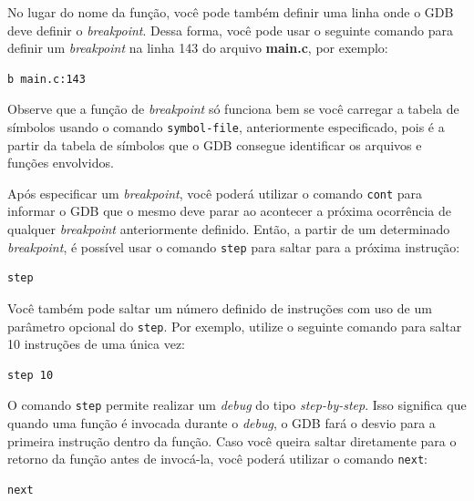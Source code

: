 \documentclass[11pt]{article}
\begin{document}
No lugar do nome da função, você pode também definir uma linha onde o GDB deve definir o \textit{breakpoint}. Dessa forma, você pode usar o seguinte comando para definir um \textit{breakpoint} na linha 143 do arquivo \textbf{main.c}, por exemplo:\\

\begin{lstlisting}[language=sh,numbers=none,frame=single]
b main.c:143
\end{lstlisting}

Observe que a função de \textit{breakpoint} só funciona bem se você carregar a tabela de símbolos usando o comando \texttt{symbol-file}, anteriormente especificado, pois é a partir da tabela de símbolos que o GDB consegue identificar os arquivos e funções envolvidos.

Após especificar um \textit{breakpoint}, você poderá utilizar o comando \texttt{cont} para informar o GDB que o mesmo deve parar ao acontecer a próxima ocorrência de qualquer \textit{breakpoint} anteriormente definido. Então, a partir de um determinado \textit{breakpoint}, é possível usar o comando  \texttt{step} para saltar para a próxima instrução:\\

\begin{lstlisting}[language=sh,numbers=none,frame=single]
step
\end{lstlisting}

Você também pode saltar um número definido de instruções com uso de um parâmetro opcional do \texttt{step}. Por exemplo, utilize o seguinte comando para saltar 10 instruções de uma única vez:\\

\begin{lstlisting}[language=sh,numbers=none,frame=single]
step 10
\end{lstlisting}

O comando \texttt{step} permite realizar um \textit{debug} do tipo \textit{step-by-step}. Isso significa que quando uma função é invocada durante o \textit{debug}, o GDB fará o desvio para a primeira instrução dentro da função. Caso você queira saltar diretamente para o retorno da função antes de invocá-la, você poderá utilizar o comando \texttt{next}:\\

\begin{lstlisting}[language=sh,numbers=none,frame=single]
next
\end{lstlisting}
\end{document}
